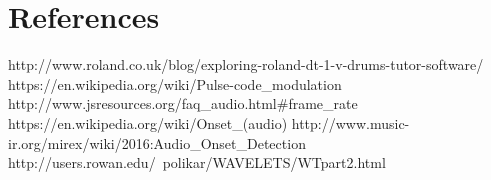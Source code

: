 \documentclass[a4paper, 11pt]{article}
\begin{document}
\maketitle{} 
\section{References}
http://www.roland.co.uk/blog/exploring-roland-dt-1-v-drums-tutor-software/
https://en.wikipedia.org/wiki/Pulse-code\_modulation
http://www.jsresources.org/faq\_audio.html\#frame\_rate
https://en.wikipedia.org/wiki/Onset\_(audio)
http://www.music-ir.org/mirex/wiki/2016:Audio\_Onset\_Detection
http://users.rowan.edu/~polikar/WAVELETS/WTpart2.html
\end{document}
